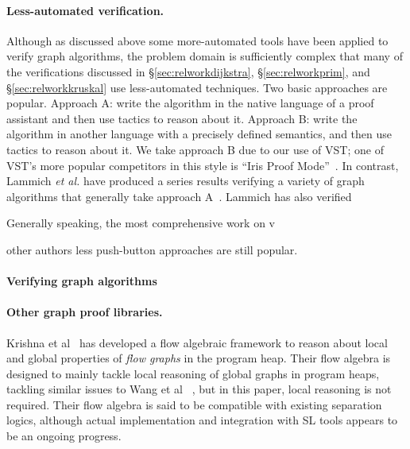 \paragraph{Less-automated verification.}
Although as discussed above some more-automated tools have been applied to verify graph algorithms, the problem domain is sufficiently complex that many of the verifications discussed in \S\ref{sec:relworkdijkstra}, \S\ref{sec:relworkprim}, and \S\ref{sec:relworkkruskal} use less-automated techniques.  Two basic approaches are popular.  Approach A: write the algorithm in the native language of a proof assistant and then use tactics to reason about it.  Approach B: write the algorithm in another language with a precisely defined semantics, and then use tactics to reason about it.  We take approach B due to our use of VST; one of VST's more popular competitors in this style is ``Iris Proof Mode''~\cite{DBLP:conf/popl/KrebbersTB17}.  In contrast, Lammich \emph{et al.} have produced a series results verifying a variety of graph algorithms that generally take approach A~\cite{DBLP:conf/itp/Lammich14,DBLP:journals/afp/LammichN19,DBLP:journals/afp/HaslbeckLB19,cite,cite,cite}.  Lammich has also verified


Generally speaking, the most comprehensive work on v


other authors less push-button approaches are still popular.

\paragraph{Verifying graph algorithms}




\paragraph{Other graph proof libraries.} Krishna et al~\cite{DBLP:conf/esop/KrishnaSW20} has developed a flow algebraic framework to reason about local and global properties of \textit{flow graphs} in the program heap. Their flow algebra is designed to mainly tackle local reasoning of global graphs in program heaps, tackling similar issues to Wang et al ~\cite{DBLP:journals/pacmpl/WangCMH19}, but in this paper, local reasoning is not required. Their flow algebra is said to be compatible with existing separation logics, although actual implementation and integration with SL tools appears to be an ongoing progress.

